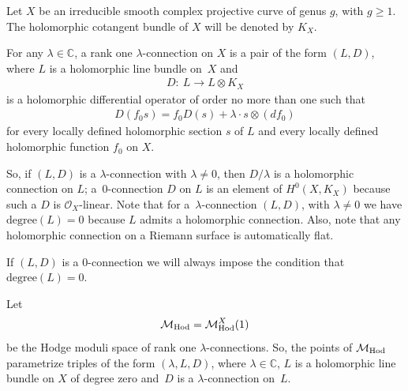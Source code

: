 \documentclass[pdftex]{sigma}
\numberwithin{equation}{section}
\begin{document}
Let $X$ be an irreducible smooth complex projective curve of genus $g$, with $g \geq 1$. The holomorphic cotangent bundle of $X$ will be denoted by $K_X$.
\begin{Definition} For any $\lambda \in \mathbb C$, a rank one $\lambda$-connection on $X$ is a pair of the form $(L, D)$, where $L$ is a holomorphic line bundle on~$X$ and
\begin{gather*}
D \colon \ L \longrightarrow L\otimes K_X
\end{gather*}
is a holomorphic dif\/ferential operator of order no more than one such that
\begin{gather*}
D(f_0s) = f_0D(s)+\lambda\cdot s\otimes (df_0)
\end{gather*}
for every locally def\/ined holomorphic section $s$ of $L$ and every locally def\/ined holomorphic function $f_0$ on $X$.
\end{Definition}

So, if $(L, D)$ is a $\lambda$-connection with $\lambda \not= 0$, then $D/\lambda$ is a holomorphic connection on $L$; a~$0$-connection $D$ on $L$ is an element of $H^0(X, K_X)$ because such a $D$ is ${\mathcal O}_X$-linear. Note that for a~$\lambda$-connection $(L, D)$, with $\lambda \not= 0$ we have $\text{degree}(L) = 0$ because $L$ admits a holomorphic connection. Also, note that any holomorphic connection on a Riemann surface is automatically f\/lat.

If $(L, D)$ is a $0$-connection we will always impose the condition that $\text{degree}(L) = 0$.

Let
\begin{gather*}
{\mathcal M}_{\rm Hod} = {\mathcal M}^X_{\rm Hod}(1)
\end{gather*}
be the Hodge moduli space of rank one $\lambda$-connections. So, the points of ${\mathcal M}_{\rm Hod}$ parametrize triples of the form $(\lambda, L, D)$, where $\lambda \in \mathbb C$, $L$ is a holomorphic line bundle on $X$ of degree zero and~$D$ is a $\lambda$-connection on~$L$.
\end{document}

